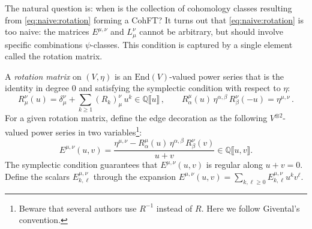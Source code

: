 \documentclass[11pt,reqno]{amsart}
\numberwithin{equation}{section}
\newcommand{\bbraket}[1]{\llbracket #1 \rrbracket}
\newcommand{\End}{\mathrm{End}}
\newcommand{\mb}[1]{\mathbb{#1}}
\newcommand{\Q}{\mb{Q}}
\theoremstyle{plain}
\theoremstyle{definition}
\begin{document}
The natural question is: when is the collection of cohomology classes resulting from \eqref{eq:naive:rotation} forming a CohFT? It turns out that \eqref{eq:naive:rotation} is too naive: the matrices $E^{\mu,\nu}$ and $L_{\mu}^{\nu}$ cannot be arbitrary, but should involve specific combinations $\psi$-classes. This condition is captured by a single element called the rotation matrix.

A \emph{rotation matrix} on $(V,\eta)$ is an $\End(V)$-valued power series that is the identity in degree $0$ and satisfying the symplectic condition with respect to $\eta$:
\begin{equation}
  R_{\mu}^{\nu}(u)
  =
  \delta_{\mu}^{\nu} + \sum_{k \ge 1} (R_k)_{\mu}^{\nu} \, u^k
  \in \Q\bbraket{u} \,,
  \qquad
  R^{\mu}_{\alpha}(u) \, \eta^{\alpha,\beta} \, R^{\nu}_{\beta}(-u) = \eta^{\mu,\nu} \,.
\end{equation}
For a given rotation matrix, define the edge decoration as the following $V^{\otimes 2}$-valued power series in two variables\footnote{Beware that several authors use $R^{-1}$ instead of $R$. Here we follow Givental's convention.}:
\begin{equation}
  E^{\mu,\nu}(u,v)
  =
  \frac{\eta^{\mu,\nu} - R^{\mu}_{\alpha}(u) \, \eta^{\alpha,\beta} \, R^{\nu}_{\beta}(v)}{u + v}
  \in
  \Q\bbraket{u,v}.
\end{equation}
The symplectic condition guarantees that $E^{\mu,\nu}(u,v)$ is regular along $u +v = 0$. Define the scalars $E^{\mu,\nu}_{k,\ell}$ through the expansion $E^{\mu,\nu}(u,v) = \sum_{k,\ell \ge 0} E^{\mu,\nu}_{k,\ell} u^k v^{\ell}$.
\end{document}

